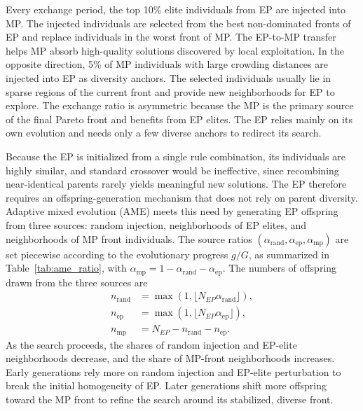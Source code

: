 \documentclass[pdflatex,iicol,Numbered,sn-basic]{sn-jnl}
\begin{document}
Every exchange period, the top 10\% elite individuals from EP are injected into MP.
The injected individuals are selected from the best non-dominated fronts of EP and replace individuals in the worst front of MP.
The EP-to-MP transfer helps MP absorb high-quality solutions discovered by local exploitation.
In the opposite direction, 5\% of MP individuals with large crowding distances are injected into EP as diversity anchors.
The selected individuals usually lie in sparse regions of the current front and provide new neighborhoods for EP to explore.
The exchange ratio is asymmetric because the MP is the primary source of the final Pareto front and benefits from EP elites. The EP relies mainly on its own evolution and needs only a few diverse anchors to redirect its search.

Because the EP is initialized from a single rule combination, its individuals are highly similar, and standard crossover would be ineffective, since recombining near-identical parents rarely yields meaningful new solutions.
The EP therefore requires an offspring-generation mechanism that does not rely on parent diversity.
Adaptive mixed evolution (AME) meets this need by generating EP offspring from three sources: random injection, neighborhoods of EP elites, and neighborhoods of MP front individuals.
The source ratios $(\alpha_{\mathrm{rand}},\alpha_{\mathrm{ep}},\alpha_{\mathrm{mp}})$ are set piecewise according to the evolutionary progress $g/G$, as summarized in Table~\ref{tab:ame_ratio}, with $\alpha_{\mathrm{mp}}=1-\alpha_{\mathrm{rand}}-\alpha_{\mathrm{ep}}$. The numbers of offspring drawn from the three sources are
\begin{equation}
  \label{eq:ame_ratio}
  \begin{aligned}
    n_{\mathrm{rand}} & =\max(1,\lfloor N_{EP}\alpha_{\mathrm{rand}}\rfloor), \\
    n_{\mathrm{ep}}   & =\max(1,\lfloor N_{EP}\alpha_{\mathrm{ep}}\rfloor),   \\
    n_{\mathrm{mp}}   & =N_{EP}-n_{\mathrm{rand}}-n_{\mathrm{ep}}.
  \end{aligned}
\end{equation}
As the search proceeds, the shares of random injection and EP-elite neighborhoods decrease, and the share of MP-front neighborhoods increases.
Early generations rely more on random injection and EP-elite perturbation to break the initial homogeneity of EP. Later generations shift more offspring toward the MP front to refine the search around its stabilized, diverse front.
\end{document}
